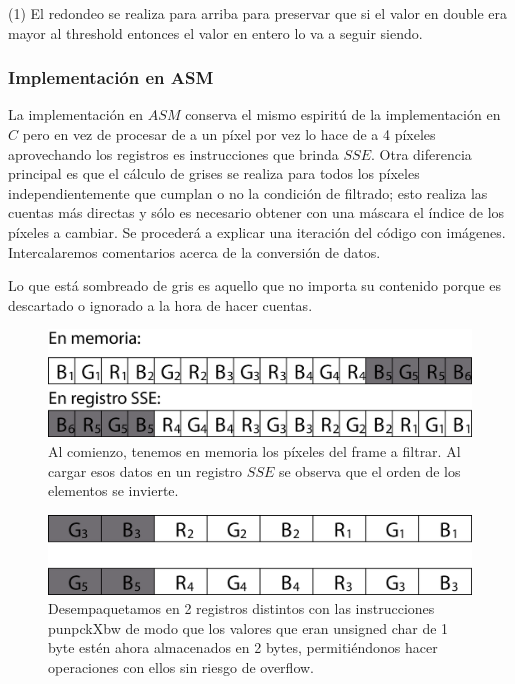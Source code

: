 	(1) El redondeo se realiza para arriba para preservar que si el valor en double era mayor al threshold entonces el valor en entero lo va a seguir siendo.

	
	\subsubsection{Implementaci\'on en ASM}
	
	La implementaci\'on en $ASM$ conserva el mismo espirit\'u de la implementaci\'on en $C$ pero en vez de procesar de a un p\'ixel por vez lo hace de a 4 p\'ixeles aprovechando los registros es instrucciones que brinda $SSE$. Otra diferencia principal es que el c\'alculo de grises se realiza para todos los p\'ixeles independientemente que cumplan o no la condici\'on de filtrado; esto realiza las cuentas m\'as directas y s\'olo es necesario obtener con una m\'ascara el \'indice de los p\'ixeles a cambiar. Se proceder\'a a explicar una iteraci\'on del c\'odigo con im\'agenes. Intercalaremos comentarios acerca de la conversi\'on de datos.
	
	Lo que est\'a sombreado de gris es aquello que no importa su contenido porque es descartado o ignorado a la hora de hacer cuentas. 
	
	\begin{figure}[H]
		\includegraphics[scale=0.9]{imgs/fcolor_asm1.png}
		\caption{Al comienzo, tenemos en memoria los p\'ixeles del frame a filtrar. Al cargar esos datos en un registro $SSE$ se observa que el orden de los elementos se invierte.} 
	\end{figure}
	
	\begin{figure}[H]
		\includegraphics[scale=0.9]{imgs/fcolor_asm2.png}
		\caption{Desempaquetamos en 2 registros distintos con las instrucciones punpckXbw de modo que los valores que eran unsigned char de 1 byte est\'en ahora almacenados en 2 bytes, permiti\'endonos hacer operaciones con ellos sin riesgo de overflow.}
	\end{figure}
	
